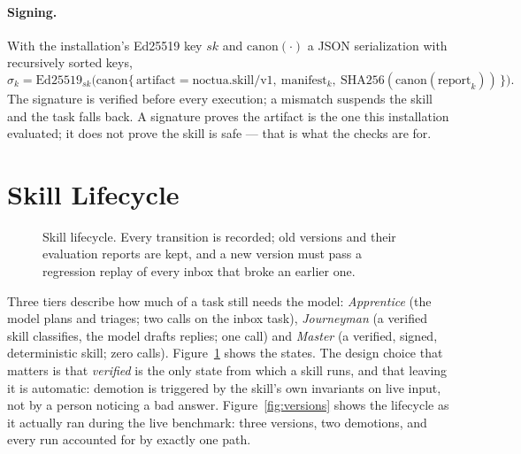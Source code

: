 \documentclass[11pt]{article}
\begin{document}
\paragraph{Signing.} With the installation's Ed25519 key $sk$ and $\mathrm{canon}(\cdot)$ a JSON serialization with
recursively sorted keys,
\begin{equation}
\sigma_k=\mathrm{Ed25519}_{sk}\bigl(\mathrm{canon}\{\,\text{artifact}{=}\text{noctua.skill/v1},\ \text{manifest}_k,\ \mathrm{SHA256}(\mathrm{canon}(\text{report}_k))\,\}\bigr).
\end{equation}
The signature is verified before every execution; a mismatch suspends the skill and the task falls back. A signature
proves the artifact is the one this installation evaluated; it does not prove the skill is safe --- that is what
the checks are for.

\section{Skill Lifecycle}\label{sec:lifecycle}

\begin{figure}[!htbp]
\centering
{}
\caption{Skill lifecycle. Every transition is recorded; old versions and their evaluation reports are kept, and a
new version must pass a regression replay of every inbox that broke an earlier one.}
\label{fig:life}
\end{figure}

Three tiers describe how much of a task still needs the model: \emph{Apprentice} (the model plans and triages; two
calls on the inbox task), \emph{Journeyman} (a verified skill classifies, the model drafts replies; one call) and
\emph{Master} (a verified, signed, deterministic skill; zero calls). Figure~\ref{fig:life} shows the states. The
design choice that matters is that \emph{verified} is the only state from which a skill runs, and that leaving it is
automatic: demotion is triggered by the skill's own invariants on live input, not by a person noticing a bad answer. Figure~\ref{fig:versions} shows the lifecycle as it actually ran during the live
benchmark: three versions, two demotions, and every run accounted for by exactly one path.
\end{document}
